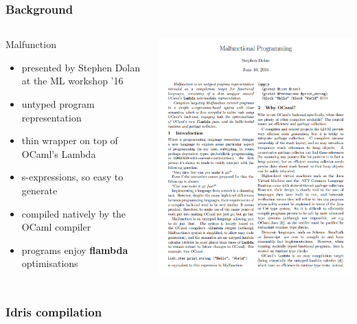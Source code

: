 \documentclass[aspectratio=169]{beamer}
\begin{document}
\begin{frame}[t]
  \frametitle{Background}
  \begin{columns}[c]
    \begin{block}{Malfunction}
      \begin{itemize}
        \item presented by Stephen Dolan at the ML workshop '16
        \item untyped program representation
        \item thin wrapper on top of OCaml's Lambda
        \item s-expressions, so easy to generate
        \item compiled natively by the OCaml compiler
        \item programs enjoy \textbf{flambda} optimisations
      \end{itemize}
    \end{block}
    \includegraphics[width=.5\textwidth]{mlfpaper.png}
  \end{columns}
\end{frame}

\begin{frame}
  \frametitle{Idris compilation}


  \centering
  \smartdiagramset{
    back arrow disabled=true,
  }
\end{frame}
\end{document}
